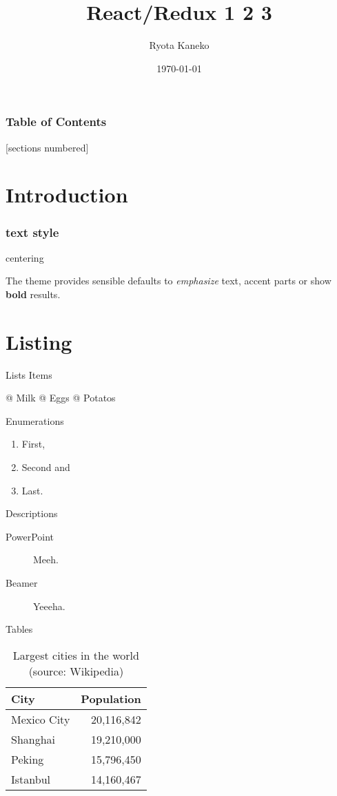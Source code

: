 \documentclass{beamer}
\title{React/Redux 1 2 3}
\date{\today}
\author{Ryota Kaneko}
\institute{Cybozu, Inc}
\begin{document}
\maketitle

\begin{frame}
\frametitle{Table of Contents}
[sections numbered]
\tableofcontents[hideallsubsections]
\end{frame}

\section{Introduction}
\begin{frame}
\frametitle{text style}
\begin{center}centering\end{center}

The theme provides sensible defaults to \emph{emphasize} text,
\alert{accent} parts or show \textbf{bold} results.
\end{frame}

\section{Listing}
\begin{frame}[fragile]{Lists}
Items
\begin{easylist}[itemize]
@ Milk
@ Eggs
@ Potatos
\end{easylist}

Enumerations
\begin{enumerate}
\item First, \item Second and \item Last.
\end{enumerate}

Descriptions
\begin{description}
\item[PowerPoint] Meeh. \item[Beamer] Yeeeha.
\end{description}
\end{frame}

\begin{frame}[fragile]{Tables}
\begin{table}
\caption{Largest cities in the world (source: Wikipedia)}
\begin{tabular}{lr}
\toprule
City & Population\\
\midrule
Mexico City & 20,116,842\\
Shanghai & 19,210,000\\
Peking & 15,796,450\\
Istanbul & 14,160,467\\
\bottomrule
\end{tabular}
\end{table}
\end{frame}
\end{document}
